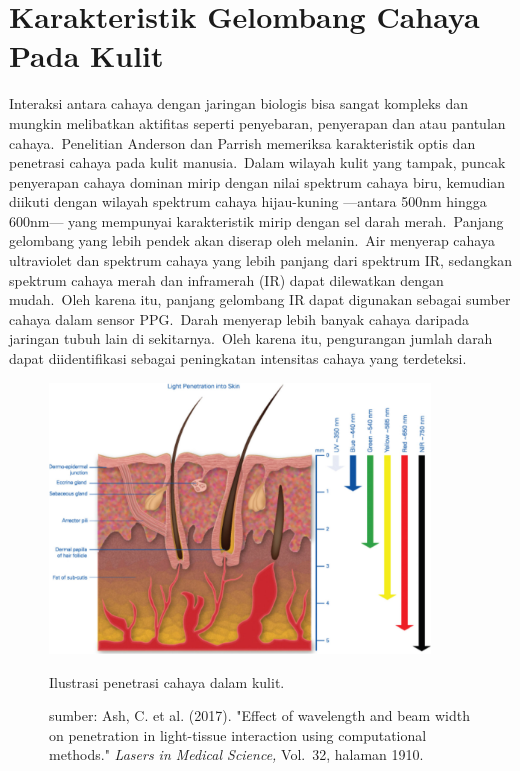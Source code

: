 \section{Karakteristik Gelombang Cahaya Pada Kulit}

Interaksi antara cahaya dengan jaringan biologis bisa sangat kompleks dan mungkin melibatkan aktifitas seperti penyebaran, penyerapan dan atau pantulan cahaya.~Penelitian Anderson dan Parrish \citep{ANDERSON1981} memeriksa karakteristik optis dan penetrasi cahaya pada kulit manusia.~Dalam wilayah kulit yang tampak, puncak penyerapan cahaya dominan mirip dengan nilai spektrum cahaya biru, kemudian diikuti dengan wilayah spektrum cahaya hijau-kuning ---antara 500nm hingga 600nm--- yang mempunyai karakteristik mirip dengan sel darah merah.~Panjang gelombang yang lebih pendek akan diserap oleh melanin.~Air menyerap cahaya ultraviolet dan spektrum cahaya yang lebih panjang dari spektrum IR, sedangkan spektrum cahaya merah dan inframerah (IR) dapat dilewatkan dengan mudah.~Oleh karena itu, panjang gelombang IR dapat digunakan sebagai sumber cahaya dalam sensor PPG.~Darah menyerap lebih banyak cahaya daripada jaringan tubuh lain di sekitarnya.~Oleh karena itu, pengurangan jumlah darah dapat diidentifikasi sebagai peningkatan intensitas cahaya yang terdeteksi. 
\newpage
\begin{figure}[ht]
	\centering
	\includegraphics[width=0.9\textwidth]{light}
	\caption{Ilustrasi penetrasi cahaya dalam kulit.}
	\caption*{sumber: Ash, C. et al. (2017). "Effect of wavelength and beam width on penetration in light-tissue interaction using computational methods." \textit{Lasers in Medical Science,} Vol.~32, halaman 1910.}
	\label{fig:light}   
\end{figure}

